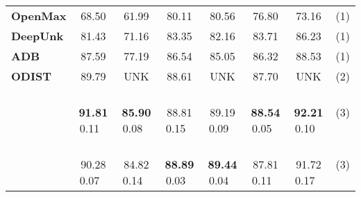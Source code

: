 \documentclass[runningheads]{llncs}
\begin{document}
\begin{table}[t]
\begin{adjustbox}{width=1\textwidth}
\begin{tabular}{l|cc|cc|cc|c}
\textbf{OpenMax}            & 68.50                                 & 61.99                                                                                  & 80.11                                 & 80.56                                                                                  & 76.80                                 & 73.16                                                                                  & (1)  \\
\textbf{DeepUnk}            & 81.43                                 & 71.16                                                                                  & 83.35                                 & 82.16                                                                                  & 83.71                                 & 86.23                                                                                  & (1)  \\
\textbf{ADB}                & 87.59                                 & 77.19                                                                                  & 86.54                                 & 85.05                                                                                  & 86.32                                 & 88.53                                                                                  & (1)  \\
\textbf{ODIST}              & 89.79                                 & UNK                                                                                    & 88.61                                 & UNK                                                                                    & 87.70                                 & UNK                                                                                    & (2)  \\ \hline
    & \,\,  \textbf{91.81}   0.11   \,\, &\,\,  \textbf{85.90}   0.08  \,\,    & \,\, 88.81   0.15 \,\,  &\,\,  89.19   0.09  \,\,  & \,\, \textbf{88.54}   0.05  \,\,  & \,\,  \textbf{92.21}   0.10  \,\,  & (3)  \\
 & \,\,  90.28   0.07  \,\,   & \,\, 84.82   0.14 \,\,    &\,\, \textbf{88.89}   0.03 \,\,     & \,\, \textbf{89.44}   0.04  \,\,   &\,\,  87.81   0.11   \,\,  &\,\,  91.72   0.17   \,\,  & (3) 
\end{tabular}
\end{adjustbox}
\end{table}
\end{document}
